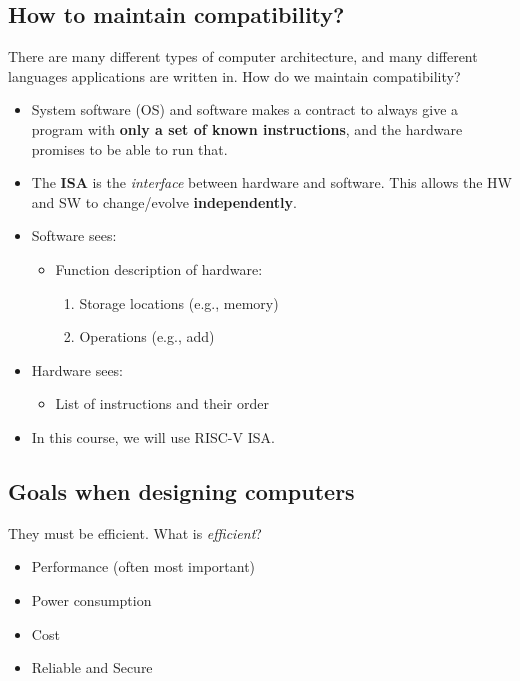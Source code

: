 \documentclass[10pt]{article}
\begin{document}
\subsection*{How to maintain compatibility?}
There are many different types of computer architecture, and many different languages applications are written in.  How do we maintain compatibility?
\begin{itemize}
    \item System software (OS) and software makes a contract to always give a program with \textbf{only a set of known instructions}, and the hardware promises to be able to run that.
    \item The \textbf{ISA} is the \textit{interface} between hardware and software.  This allows the HW and SW to change/evolve \textbf{independently}.
    \item Software sees:
    \begin{itemize}
        \item Function description of hardware:
        \begin{enumerate}
            \item Storage locations (e.g., memory)
            \item Operations (e.g., add)
        \end{enumerate}
    \end{itemize}
    \item Hardware sees:
    \begin{itemize}
        \item List of instructions and their order
    \end{itemize}
    \item In this course, we will use RISC-V ISA.
\end{itemize}
\subsection*{Goals when designing computers}
They must be efficient. What is \textit{efficient}?
\begin{itemize}
    \item Performance (often most important)
    \item Power consumption
    \item Cost
    \item Reliable and Secure
\end{itemize}
\end{document}

